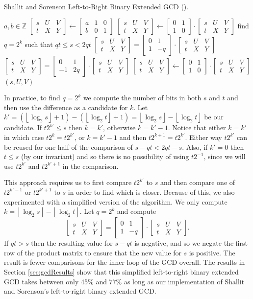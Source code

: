 \documentclass{ucalgthes1}
\theoremstyle{definition}
\newcommand{\ZZ}{\mathbb{Z}}
\newcommand{\matrixtt}[4]{\left[ \begin{array}{rr} #1 & #2 \\ #3 & #4 \end{array} \right]}
\newcommand{\matrixThreeTwo}[6]{\left[ \begin{array}{rrr} #1 & #2 & #3 \\ #4 & #5 & #6 \end{array} \right]}
\newcommand{\floor}[1]{\left\lfloor #1 \right\rfloor}
\begin{document}
\begin{algorithm}[htb]
\caption{Shallit and Sorenson Left-to-Right Binary Extended GCD (\cite{Shallit1994}).}
\label{alg:shallitGcd}
\begin{algorithmic}[1]
\Require $a,b \in \ZZ$
\State $\matrixThreeTwo{s}{U}{V}{t}{X}{Y} \gets 
        \matrixThreeTwo{a}{1}{0}{b}{0}{1}$
	\State $\matrixThreeTwo{s}{U}{V}{t}{X}{Y} \gets
	        \matrixtt{0}{1}{1}{0} \cdot \matrixThreeTwo{s}{U}{V}{t}{X}{Y}$
\EndIf
{}
	\State find $q=2^k$ such that $qt \le s < 2qt$
		\State $\matrixThreeTwo{s}{U}{V}{t}{X}{Y} =
		\matrixtt{0}{1}{1}{-q} \cdot \matrixThreeTwo{s}{U}{V}{t}{X}{Y}$
	\Else
		\State $\matrixThreeTwo{s}{U}{V}{t}{X}{Y} =
		\matrixtt{0}{1}{-1}{2q} \cdot \matrixThreeTwo{s}{U}{V}{t}{X}{Y}$
	\EndIf
		\State $\matrixThreeTwo{s}{U}{V}{t}{X}{Y} \gets
	    	    \matrixtt{0}{1}{1}{0} \cdot \matrixThreeTwo{s}{U}{V}{t}{X}{Y}$
	\EndIf
\EndWhile
\State \Return $(s, U, V)$
\end{algorithmic}
\end{algorithm}
In practice, to find $q=2^k$ we compute the number of bits in both $s$ and $t$ and then use the difference as a candidate for $k$.  Let $k' = (\floor{\log_2s} + 1) - (\floor{\log_2t}+1) = \floor{\log_2s} - \floor{\log_2t}$ be our candidate.  If $t2^{k'} \le s$ then $k = k'$, otherwise $k = k'-1$.  Notice that either $k=k'$ in which case $t2^k=t2^{k'}$, or $k=k'-1$ and then $t2^{k+1} = t2^{k'}$.  Either way $t2^{k'}$ can be reused for one half of the comparison of $s-qt < 2qt - s$.  Also, if $k' = 0$ then $t \le s$ (by our invariant) and so there is no possibility of using $t2^{-1}$, since we will use $t2^{k'}$ and $t2^{k'+1}$ in the comparison.


This approach requires us to first compare $t2^{k'}$ to $s$ and then compare one of $t2^{k'-1}$ or $t2^{k'+1}$ to $s$ in order to find which is closer.  Because of this, we also experimented with a simplified version of the algorithm.  We only compute $k = \floor{\log_2s}-\floor{\log_2t}$.  Let $q=2^k$ and compute
\[
	\matrixThreeTwo{s}{U}{V}{t}{X}{Y} =
		\matrixtt{0}{1}{1}{-q} \cdot \matrixThreeTwo{s}{U}{V}{t}{X}{Y}.
\]
If $qt > s$ then the resulting value for $s-qt$ is negative, and so we negate the first row of the product matrix to ensure that the new value for $s$ is positive.  The result is fewer comparisons for the inner loop of the GCD overall.  The results in Section \ref{sec:gcdResults} show that this simplified left-to-right binary extended GCD takes between only 45\% and 77\% as long as our implementation of Shallit and Sorenson's left-to-right binary extended GCD.
\end{document}

